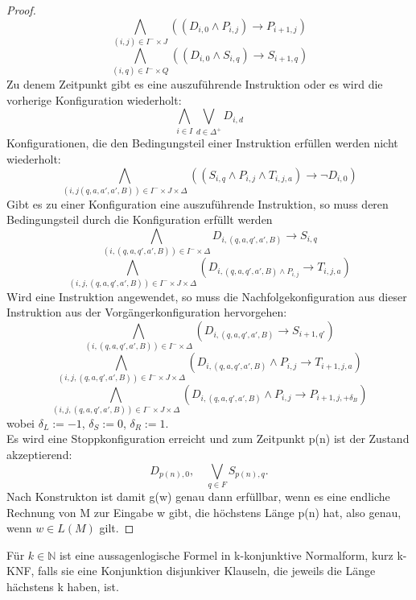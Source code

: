 \begin{proof}
\[        \]
        \[
            \bigwedge \limits_{(i, j) \in I^- \times J } ((D_{i,0} \wedge P_{i, j}) \to P_{i+ 1, j} )
        \]
        \[
            \bigwedge \limits_{(i,q) \in I^- \times Q } ((D_{i,0} \wedge S_{i, q}) \to S_{i+ 1, q})
        \]
        Zu denem Zeitpunkt gibt es eine auszuführende Instruktion oder es wird die vorherige Konfiguration wiederholt:
        \[
            \bigwedge \limits_{i \in I} \bigvee \limits_{d \in \Delta^+} D_{i, d}
        \]
        Konfigurationen, die den Bedingungsteil einer Instruktion erfüllen werden nicht wiederholt:
        \[
            \bigwedge \limits_{(i, j(q, a, a', a', B)) \in I^- \times J \times \Delta} ((S_{i, q} \wedge P_{i, j} \wedge T_{i, j, a}) \to \lnot D_{i, 0})  
        \]
        Gibt es zu einer Konfiguration eine auszuführende Instruktion, so muss deren Bedingungsteil durch die Konfiguration erfüllt werden
        \[
            \bigwedge \limits_{(i, (q, a, q', a', B)) \in I^- \times \Delta} D_{i, (q, a, q',a',B)} \to S_{i,q}
        \]  
        \[
            \bigwedge \limits_{(i, j,(q, a, q', a', B)) \in I^- \times J \times  \Delta} (D_{i, (q, a, q',a',B) \wedge P_{i, j}} \to T_{i,j, a})
        \]  
        Wird eine Instruktion angewendet, so muss die Nachfolgekonfiguration aus dieser Instruktion aus der Vorgängerkonfiguration hervorgehen:
        \[
            \bigwedge \limits_{(i, (q, a, q', a', B)) \in I^- \times \Delta} (D_{i, (q, a, q',a',B)} \to S_{i + 1, q'})
        \]  
        \[
            \bigwedge \limits_{(i, j, (q, a, q', a', B)) \in I^- \times J \times \Delta} (D_{i, (q, a, q',a',B)} \wedge P_{i, j} \to T_{i + 1, j, a})
        \] 
        \[
            \bigwedge \limits_{(i, j, (q, a, q', a', B)) \in I^- \times J \times \Delta} (D_{i, (q, a, q',a',B)}\wedge P_{i, j} \to P_{i + 1, j, + \delta_B})
        \]  
        wobei \(\delta_L := -1\), \(\delta_S := 0\), \(\delta_R:= 1\).
        \vspace*{0.5cm}
        \\
        Es wird eine Stoppkonfiguration erreicht und zum Zeitpunkt p(n) ist der Zustand akzeptierend:
        \[
            D_{p(n), 0}, \quad \bigvee \limits_{q \in F} S_{p(n), q}.    
        \]
        Nach Konstrukton ist damit g(w) genau dann erfüllbar, wenn es eine endliche Rechnung von M zur Eingabe w gibt, die höchstens Länge p(n) hat, also genau, wenn \(w \in L(M)\) gilt.
    \end{proof}

\newpage

    Für \(k \in \mathbb{N}\) ist eine aussagenlogische Formel in k-konjunktive Normalform, kurz k-KNF, falls sie eine Konjunktion disjunkiver Klauseln, die jeweils die Länge hächstens k haben, ist.

